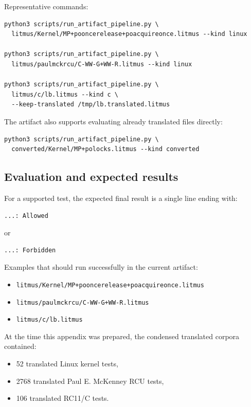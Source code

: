 \documentclass{sigplanconf}
\begin{document}
Representative commands:

\begin{verbatim}
python3 scripts/run_artifact_pipeline.py \
  litmus/Kernel/MP+pooncerelease+poacquireonce.litmus --kind linux

python3 scripts/run_artifact_pipeline.py \
  litmus/paulmckrcu/C-WW-G+WW-R.litmus --kind linux

python3 scripts/run_artifact_pipeline.py \
  litmus/c/lb.litmus --kind c \
  --keep-translated /tmp/lb.translated.litmus
\end{verbatim}

The artifact also supports evaluating already translated files directly:

\begin{verbatim}
python3 scripts/run_artifact_pipeline.py \
  converted/Kernel/MP+polocks.litmus --kind converted
\end{verbatim}

\subsection{Evaluation and expected results}

For a supported test, the expected final result is a single line ending with:

\begin{verbatim}
...: Allowed
\end{verbatim}

or

\begin{verbatim}
...: Forbidden
\end{verbatim}

Examples that should run successfully in the current artifact:

\begin{itemize}
  \item \texttt{litmus/Kernel/MP+pooncerelease+poacquireonce.litmus}
  \item \texttt{litmus/paulmckrcu/C-WW-G+WW-R.litmus}
  \item \texttt{litmus/c/lb.litmus}
\end{itemize}

At the time this appendix was prepared, the condensed translated corpora
contained:

\begin{itemize}
  \item 52 translated Linux kernel tests,
  \item 2768 translated Paul E. McKenney RCU tests,
  \item 106 translated RC11/C tests.
\end{itemize}
\end{document}

